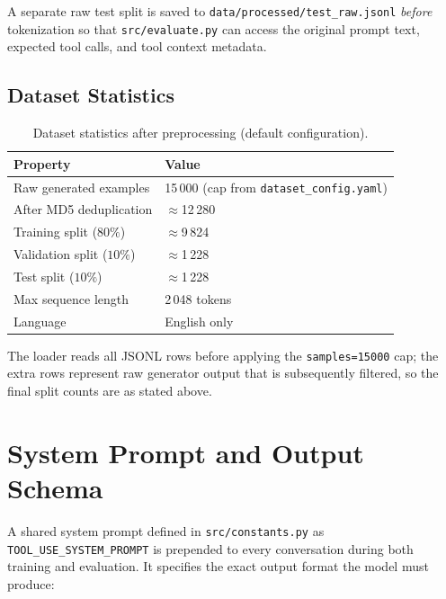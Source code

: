 \documentclass[12pt, a4paper]{article}
\newcommand{\thead}[1]{\textbf{#1}}
\begin{document}
A separate raw test split is saved to \texttt{data/processed/test\_raw.jsonl}
\textit{before} tokenization so that \texttt{src/evaluate.py} can access the
original prompt text, expected tool calls, and tool context metadata.

\subsection{Dataset Statistics}

\begin{table}[H]
\centering
\caption{Dataset statistics after preprocessing (default configuration).}
\begin{tabularx}{\linewidth}{L{5cm} C{9.2cm}}
\toprule
\thead{Property} & \thead{Value} \\
\midrule
Raw generated examples & 15\,000 (cap from \texttt{dataset\_config.yaml}) \\
After MD5 deduplication & ${\approx}$12\,280 \\
Training split ($80\%$) & ${\approx}$9\,824 \\
Validation split ($10\%$) & ${\approx}$1\,228 \\
Test split ($10\%$) & ${\approx}$1\,228 \\
Max sequence length & 2\,048 tokens \\
Language & English only \\
\bottomrule
\end{tabularx}
\end{table}

The loader reads all JSONL rows before applying the \texttt{samples=15000}
cap; the extra rows represent raw generator output that is subsequently
filtered, so the final split counts are as stated above.

\newpage

\section{System Prompt and Output Schema}

A shared system prompt defined in \texttt{src/constants.py} as
\texttt{TOOL\_USE\_SYSTEM\_PROMPT} is prepended to every conversation during
both training and evaluation. It specifies the exact output format the model
must produce:
\end{document}
